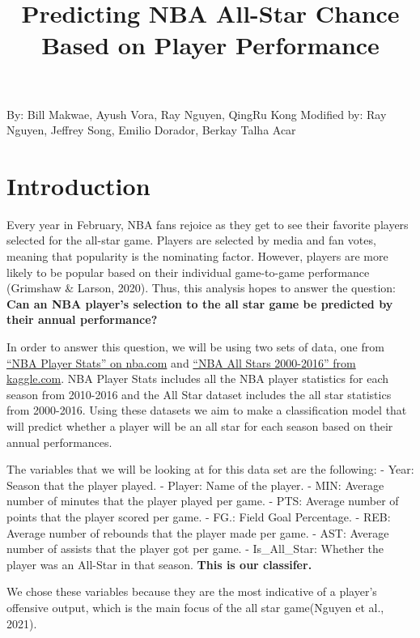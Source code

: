 \documentclass[
]{article}
\title{Predicting NBA All-Star Chance Based on Player Performance}
\author{}
\date{\vspace{-2.5em}}
\begin{document}
\maketitle

{
\setcounter{tocdepth}{2}
\tableofcontents
}
By: Bill Makwae, Ayush Vora, Ray Nguyen, QingRu Kong
Modified by: Ray Nguyen, Jeffrey Song, Emilio Dorador, Berkay Talha Acar

\hypertarget{introduction}{%
\section{Introduction}\label{introduction}}

Every year in February, NBA fans rejoice as they get to see their favorite players selected for the all-star game. Players are selected by media and fan votes, meaning that popularity is the nominating factor. However, players are more likely to be popular based on their individual game-to-game performance (Grimshaw \& Larson, 2020). Thus, this analysis hopes to answer the question: \textbf{Can an NBA player's selection to the all star game be predicted by their annual performance?}

In order to answer this question, we will be using two sets of data, one from \href{https://www.nba.com/stats/players/traditional/?sort=PTS\&dir=-1\&Season=2015-16\&SeasonType=Regular\%20Season}{``NBA Player Stats'' on nba.com} and \href{https://www.kaggle.com/fmejia21/nba-all-star-game-20002016?select=NBA+All+Stars+2000-2016+-+Sheet1.csv}{``NBA All Stars 2000-2016'' from kaggle.com}. NBA Player Stats includes all the NBA player statistics for each season from 2010-2016 and the All Star dataset includes the all star statistics from 2000-2016. Using these datasets we aim to make a classification model that will predict whether a player will be an all star for each season based on their annual performances.

The variables that we will be looking at for this data set are the following:
- Year: Season that the player played.
- Player: Name of the player.
- MIN: Average number of minutes that the player played per game.
- PTS: Average number of points that the player scored per game.
- FG.: Field Goal Percentage.
- REB: Average number of rebounds that the player made per game.
- AST: Average number of assists that the player got per game.
- Is\_All\_Star: Whether the player was an All-Star in that season. \textbf{This is our classifer.}

We chose these variables because they are the most indicative of a player's offensive output, which is the main focus of the all star game(Nguyen et al., 2021).
\end{document}
